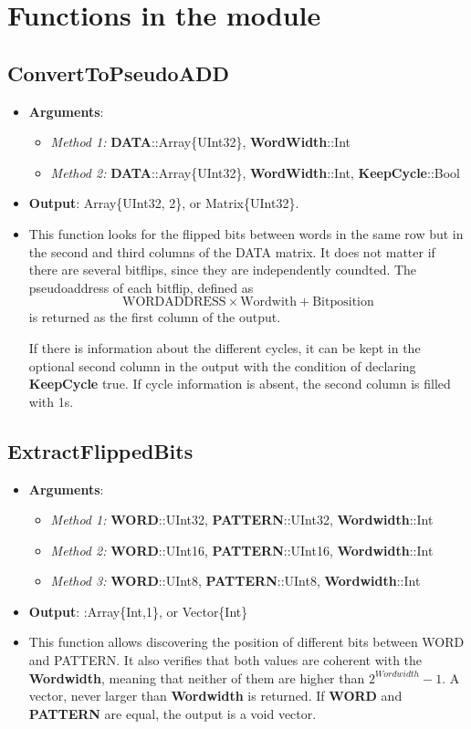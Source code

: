  \section{Functions in the module}
 
 \subsection*{ConvertToPseudoADD}
 \begin{itemize}
 	\item \textbf{Arguments}: 
 		\begin{itemize}
 			\item \textit{Method 1: }\textbf{DATA}::Array\{UInt32\}, \textbf{WordWidth}::Int
 			\item \textit{Method 2: }\textbf{DATA}::Array\{UInt32\}, \textbf{WordWidth}::Int, \textbf{KeepCycle}::Bool
 		\end{itemize}
 	\item   \textbf{Output}: Array\{UInt32, 2\}, or Matrix\{UInt32\}.
 	\item  This function looks for the flipped bits between words in the same row but in the second
 	 and third columns of the DATA matrix. It does not matter if there are several bitflips, since they are independently coundted. 
 	 The pseudoaddress  of each bitflip, defined as \[\text{WORDADDRESS}\times\text{Wordwith}+\text{Bitposition}\] is returned as the first column of the output.
 	
 	 If there is information about the different cycles, it can be kept in the optional second column in the output with the condition of declaring \textbf{KeepCycle} true. If cycle information is absent, the second column is filled with 1s.
 	
 \end{itemize}

\subsection*{ExtractFlippedBits}
\begin {itemize}
	\item \textbf{Arguments}:
		\begin{itemize}
			\item \textit{Method 1: }\textbf{WORD}::UInt32, \textbf{PATTERN}::UInt32, \textbf{Wordwidth}::Int
			\item \textit{Method 2: }\textbf{WORD}::UInt16, \textbf{PATTERN}::UInt16, \textbf{Wordwidth}::Int
			\item \textit{Method 3: }\textbf{WORD}::UInt8, \textbf{PATTERN}::UInt8, \textbf{Wordwidth}::Int
		\end{itemize}
	\item \textbf{Output}: :Array\{Int,1\}, or Vector\{Int\}
	\item This function allows discovering the position of different bits between WORD
	 and PATTERN. It also verifies that both values are coherent with the \textbf{Wordwidth},
	 meaning that neither of them are higher than \(2^{Wordwidth}-1\). A vector, never larger than \textbf{Wordwidth} is returned. If \textbf{WORD} and \textbf{PATTERN} are equal, the output is a void vector.
\end{itemize}


